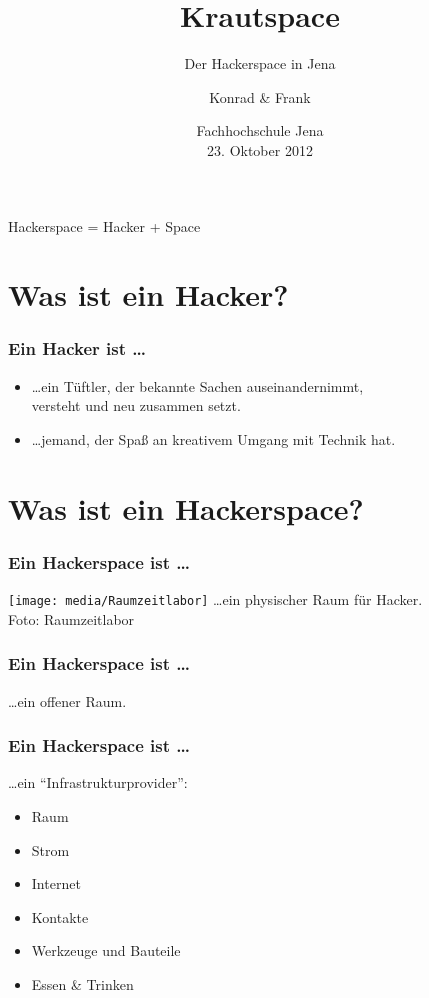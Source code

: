 \documentclass[english,compress,handout]{beamer}
\title{Krautspace}
\subtitle{Der Hackerspace in Jena}
\author[Schöbel]{Konrad \& Frank}
\institute[Hackspace Jena]{Hackspace Jena}
\date[23/10/2012]{Fachhochschule Jena \\ 23. Oktober 2012}
\begin{document}
\begin{center}

\begin{frame}
	\titlepage
\end{frame}

\begin{frame}
	\Large Hackerspace \quad = \quad Hacker \quad + \quad Space
\end{frame}

\section{Was ist ein Hacker?}

\begin{frame}
	\frametitle{Ein Hacker ist \ldots}
	\begin{itemize}
		\item \ldots ein Tüftler, der bekannte Sachen auseinandernimmt, \\
			versteht und neu zusammen setzt. \bigskip\\
		\item \ldots jemand, der Spaß an kreativem Umgang mit Technik hat.
	\end{itemize}
\end{frame}

\section{Was ist ein Hackerspace?}

\begin{frame}
	\frametitle{Ein Hackerspace ist \ldots}
	\vfill
	\texttt{[image: media/Raumzeitlabor]}
	\vfill
	\ldots ein physischer Raum für Hacker.\\
	\hfill
	\tiny{Foto: Raumzeitlabor}
\end{frame}

\begin{frame}
	\frametitle{Ein Hackerspace ist \ldots}
	\ldots ein offener Raum.
\end{frame}

\begin{frame}
	\frametitle{Ein Hackerspace ist \ldots}
	\ldots ein "`Infrastrukturprovider"':
	\vfill
	\begin{itemize}
		\item Raum
		\item Strom
		\item Internet
		\item Kontakte
		\item Werkzeuge und Bauteile
		\item Essen \& Trinken
	\end{itemize}
\end{frame}


\end{center}
\end{document}
